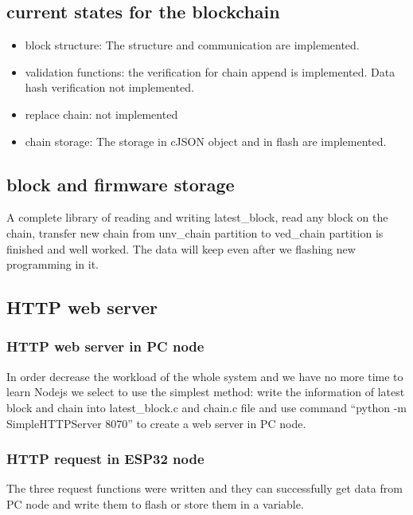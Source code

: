 \documentclass{article}
\begin{document}
    \subsection{current states for the blockchain}
    \begin{itemize}
        \item block structure: The structure and communication are implemented.
        \item validation functions: the verification for chain append is implemented. Data hash verification not implemented.
        \item replace chain: not implemented
        \item chain storage: The storage in cJSON object and in flash are implemented.
    \end{itemize}

    \subsection{block and firmware storage}
    A complete library of reading and writing latest\_block, read any block on the chain, transfer new chain from unv\_chain partition to ved\_chain partition is finished and well worked. The data will keep even after we flashing new programming in it.

    \subsection{HTTP web server}
    \subsubsection{HTTP web server in PC node}
    In order decrease the workload of the whole system and we have no more time to learn Nodejs we select to use the simplest method: write the information of latest block and chain into latest\_block.c and chain.c file and use command “python -m SimpleHTTPServer 8070” to create a web server in PC node.

    \subsubsection{HTTP request in ESP32 node}
    The three request functions were written and they can successfully get data from PC node and write them to flash or store them in a variable.
\end{document}
